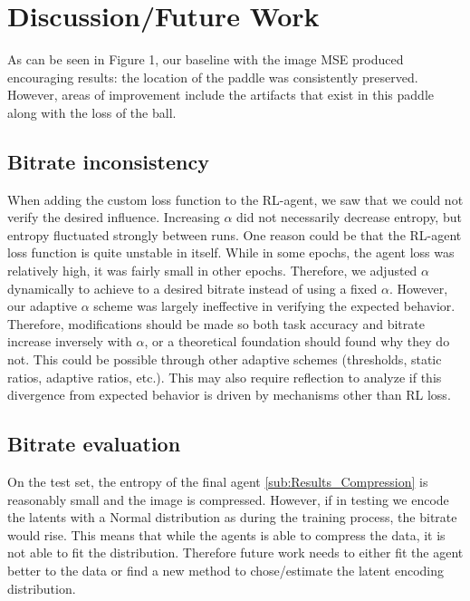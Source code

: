 \section{Discussion/Future Work}
As can be seen in Figure 1, our baseline with the image MSE produced encouraging
results: the location of the paddle was consistently preserved. However, areas
of improvement include the artifacts that exist in this paddle along with the
loss of the ball.
\subsection{Bitrate inconsistency}
When adding the custom loss function to the RL-agent, we saw that we could not verify the desired influence. Increasing $\alpha$ did not necessarily decrease
entropy, but entropy fluctuated strongly between runs. One
reason could be that the RL-agent loss function is quite
unstable in itself. While in some epochs, the agent loss was relatively high, it was fairly small in
other epochs. Therefore, we adjusted $\alpha$
dynamically to achieve to a desired bitrate instead of using a fixed $\alpha$.
However, our adaptive $\alpha$ scheme was largely ineffective in verifying the
expected behavior. Therefore, modifications should be made so both task
accuracy and bitrate increase inversely with $\alpha$, or a theoretical
foundation should found why they do not. This could be possible through other
adaptive schemes (thresholds, static ratios, adaptive ratios, etc.). This may
also require reflection to analyze if this divergence from expected behavior is
driven by mechanisms other than RL loss.
\subsection{Bitrate evaluation}
On the test set, the entropy of the final agent \ref{sub:Results_Compression} is
reasonably small and the image is compressed. However, if in testing we encode
the latents with a Normal distribution as during the training process, the
bitrate would rise. This means that while the agents is able to
compress the data, it is not able to fit the distribution.
Therefore future work needs to either fit the agent better to the data or find
a new method to chose/estimate the latent encoding distribution.


